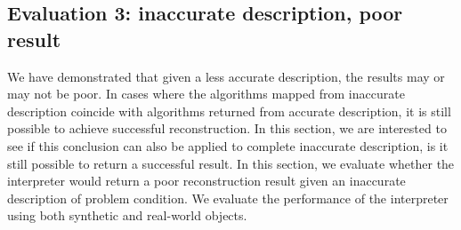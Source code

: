 \subsection{Evaluation 3: inaccurate description, poor result}
We have demonstrated that given a less accurate description, the results may or may not be poor. In cases where the algorithms mapped from inaccurate description coincide with algorithms returned from accurate description, it is still possible to achieve successful reconstruction. In this section, we are interested to see if this conclusion can also be applied to complete inaccurate description, \ie is it still possible to return a successful result. In this section, we evaluate whether the interpreter would return a poor reconstruction result given an inaccurate description of problem condition. We evaluate the performance of the interpreter using both synthetic and real-world objects.
